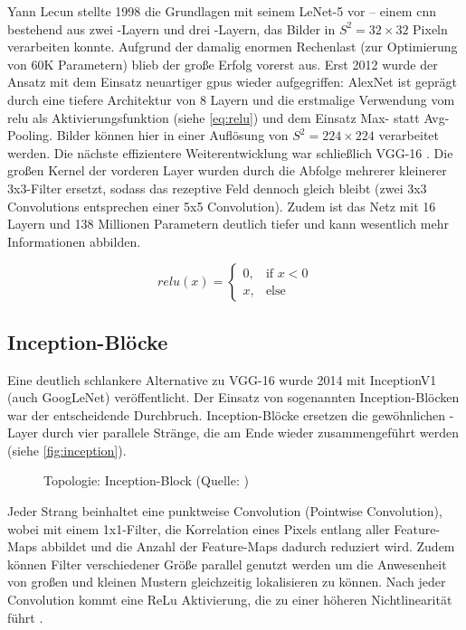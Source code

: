 Yann Lecun stellte 1998 die Grundlagen mit seinem LeNet-5 vor \cite{Lecun98} -- einem \gls{cnn} bestehend aus zwei \conv-Layern und drei \fc-Layern, das Bilder in $S^2=32 \times 32$ Pixeln verarbeiten konnte.
Aufgrund der damalig enormen Rechenlast (zur Optimierung von 60K Parametern) blieb der große Erfolg vorerst aus.
Erst 2012 wurde der Ansatz mit dem Einsatz neuartiger \glspl{gpu} wieder aufgegriffen:
AlexNet \cite{Krizhevsky12} ist geprägt durch eine tiefere Architektur von 8 Layern und die erstmalige Verwendung vom \gls{relu} als Aktivierungsfunktion (siehe \autoref{eq:relu}) und dem Einsatz Max- statt Avg-Pooling.
Bilder können hier in einer Auflösung von $S^2=224 \times 224$ verarbeitet werden.
Die nächste effizientere Weiterentwicklung war schließlich VGG-16 \cite{Simonyan15}.
Die großen Kernel der vorderen Layer wurden durch die Abfolge mehrerer kleinerer 3x3-Filter ersetzt, sodass das rezeptive Feld dennoch gleich bleibt (zwei 3x3 Convolutions entsprechen einer 5x5 Convolution).
Zudem ist das Netz mit 16 Layern und 138 Millionen Parametern deutlich tiefer und kann wesentlich mehr Informationen abbilden.

\begin{equation}
    \label{eq:relu}
    relu(x) = \begin{cases}
                    0, & \text{if } x < 0\\
                    x, & \text{else}
    \end{cases}
\end{equation}

\subsection{Inception-Blöcke}

Eine deutlich schlankere Alternative zu VGG-16 wurde 2014 mit InceptionV1 (auch GoogLeNet) \cite{Szegedy14} veröffentlicht.
Der Einsatz von sogenannten Inception-Blöcken war der entscheidende Durchbruch.
Inception-Blöcke ersetzen die gewöhnlichen \conv-Layer durch vier parallele Stränge, die am Ende wieder zusammengeführt werden (siehe \autoref{fig:inception}).

\begin{figure}[hb!]
    \centering
    \caption{Topologie: Inception-Block (Quelle: \cite{Karim19})}
    \label{fig:inception}
\end{figure}

Jeder Strang beinhaltet eine punktweise Convolution (Pointwise Convolution), wobei mit einem 1x1-Filter, die Korrelation eines Pixels entlang aller Feature-Maps abbildet und die Anzahl der Feature-Maps dadurch reduziert wird.
Zudem können Filter verschiedener Größe parallel genutzt werden um die Anwesenheit von großen und kleinen Mustern gleichzeitig lokalisieren zu können.
Nach jeder Convolution kommt eine ReLu Aktivierung, die zu einer höheren Nichtlinearität führt \cite{Pointer19}.

